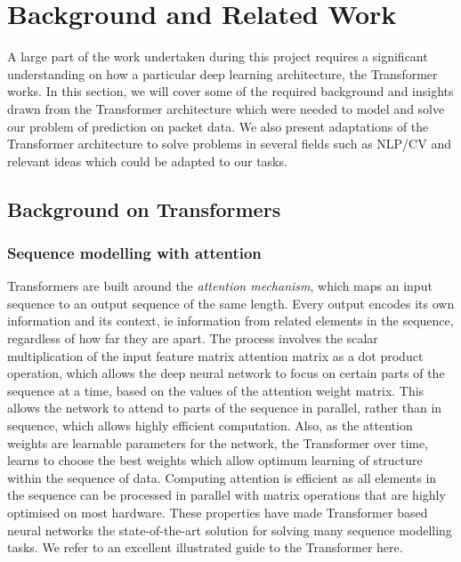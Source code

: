 \chapter{Background and Related Work}
\label{cha:background}

A large part of the work undertaken during this project requires a significant understanding on how a particular deep learning architecture, the Transformer works. In this section, we will cover some of the required background and insights drawn from the Transformer architecture which were needed to model and solve our problem of prediction on packet data. We also present adaptations of the Transformer architecture to solve problems in several fields such as NLP/CV and relevant ideas which could be adapted to our tasks.

\section{Background on Transformers}
\label{sec:background}

\subsection{Sequence modelling with attention}

Transformers are built around the \emph{attention mechanism}, which maps an input sequence to an output sequence of the same length.
Every output encodes its own information and its context, ie information from related elements in the sequence, regardless of how far they are apart.
The process involves the scalar multiplication of the input feature matrix attention matrix as a dot product operation, which allows the deep neural network to focus on certain parts of the sequence at a time, based on the values of the attention weight matrix. This allows the network to attend to parts of the sequence in parallel, rather than in sequence, which allows highly efficient computation. Also, as the attention weights are learnable parameters for the network, the Transformer over time, learns to choose the best weights which allow optimum learning of structure within the sequence of data.
Computing attention is efficient as all elements in the sequence can be processed in parallel with matrix operations that are highly optimised on most hardware. These properties have made Transformer based neural networks the state-of-the-art solution for solving many sequence modelling tasks. We refer to an excellent illustrated guide to the Transformer here\cite{trans}.


